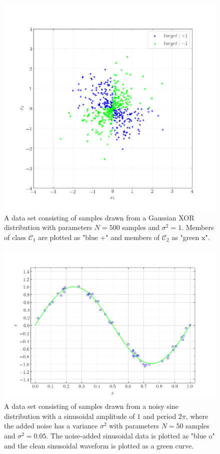 \documentclass[conference]{IEEEtran}
\begin{document}
\begin{figure}[p!]
\centerline{\includegraphics[trim=0 0 0 0, clip, width=\columnwidth]{Figure_4.png}}
\caption{A data set consisting of samples drawn from a Gaussian XOR distribution with parameters $N=500$ samples and $\sigma^2=1$. Members of class $\mathscr{C}_1$ are plotted as "blue +" and members of $\mathscr{C}_2$ as "green x".
}
\label{fig:gaussx}
\end{figure}

\begin{figure}[p!]
\centerline{\includegraphics[trim=0 0 0 0, clip, width=\columnwidth]{Figure_5.png}}
\caption{A data set consisting of samples drawn from a noisy sine distribution with a sinusoidal amplitude of $1$ and period $2\pi$, where the added noise has a variance $\sigma^2$ with parameters $N=50$ samples and $\sigma^2=0.05$. The noise-added sinusoidal data is plotted as "blue o" and the clean sinusoidal waveform is plotted as a green curve.}
\label{fig:noisysingen}
\end{figure}
\end{document}
